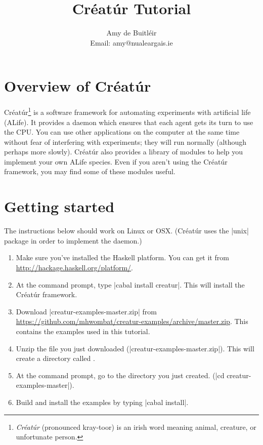 \documentclass[a4paper,10pt]{report}
\title{Créatúr Tutorial}
\author{Amy de Buitl\'eir\\
        Email: amy@nualeargais.ie}
\begin{document}
\maketitle

\tableofcontents

\chapter{Overview of Créatúr}

Créatúr\footnote{\emph{Créatúr} (pronounced kray-toor) is an irish word 
meaning animal, creature, or unfortunate person.} 
is a software framework for automating experiments
with artificial life (ALife). 
It provides a daemon which ensures that each agent gets its turn 
to use the CPU. 
You can use other applications on the computer at the same time
without fear of interfering with experiments; they
will run normally (although perhaps more slowly).
Créatúr also provides a library of modules to help you implement your own 
ALife species.
Even if you aren't using the Créatúr framework, you may find some of these
modules useful.

\chapter{Getting started}
\label{sec:install}



The instructions below should work on Linux or OSX.
(Créatúr uses the |unix| package in order to implement the daemon.)

\begin{enumerate}
\item Make sure you've installed the Haskell platform. You can get it from
\url{http://hackage.haskell.org/platform/}.

\item At the command prompt, type |cabal install creatur|.
This will install the Créatúr framework.

\item Download |creatur-examples-master.zip| from
\url{https://github.com/mhwombat/creatur-examples/archive/master.zip}.
This contains the examples used in this tutorial.

\item Unzip the file you just downloaded (|creatur-examples-master.zip|).
This will create a directory called .

\item At the command prompt, go to the directory you just created.
(|cd creatur-examples-master|).

\item Build and install the examples by typing |cabal install|.
\end {enumerate}
\end{document}
